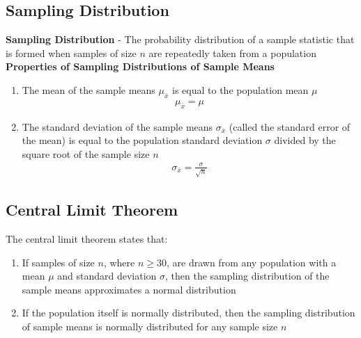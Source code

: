 \documentclass[a4paper]{article}
\let\bf\textbf
\begin{document}
\subsection{Sampling Distribution}
\bf{Sampling Distribution} - The probability distribution of a sample statistic that is formed when samples of size $n$ are repeatedly taken from a population
\vspace{1mm}\\
\bf{Properties of Sampling Distributions of Sample Means}
\begin{enumerate}
    \item The mean of the sample means $\mu_{\bar{x}}$ is equal to the population mean $\mu$
    \begin{align}
        \mu_{\bar{x}} = \mu
    \end{align}
    \item The standard deviation of the sample means $\sigma_{\bar{x}}$ (called the standard error of the mean) is equal to the population standard deviation $\sigma$ divided by the square root of the sample size $n$
    \begin{align}
        \sigma_{\bar{x}} = \frac{\sigma}{\sqrt{n}}
    \end{align}
\end{enumerate}
\subsection{Central Limit Theorem}
The central limit theorem states that:
\begin{enumerate}
    \item If samples of size $n$, where $n \geq 30$, are drawn from any population with a mean $\mu$ and standard deviation $\sigma$, then the sampling distribution of the sample means approximates a normal distribution
    \item If the population itself is normally distributed, then the sampling distribution of sample means is normally distributed for any sample size $n$
\end{enumerate}
\end{document}

